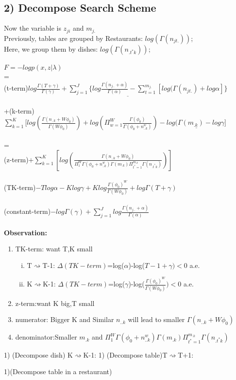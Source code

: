 \documentclass{article}
\begin{document}
\begin{spacing}{1.1}
\section{2) Decompose Search Scheme}
Now the variable is $z_{ji}$ and $m_{j.}$\\
Previously, tables are grouped by Restaurants: $log(\Gamma(n_{jt.}))$;\\
Here, we group them by dishes: $log(\Gamma(n_{.t^{*}k}))$;\\ \\
$F=-log p(x,z|\lambda)$\\ =\\
(t-term)$ \underline{log \frac{\Gamma(T+\gamma)}{\Gamma(\gamma)}+\sum_{j=1}^{J} \{log \frac{\Gamma(n_{j..}+\alpha)}{\Gamma(\alpha)}-\sum_{t=1}^{m_{j.}}[log(\Gamma(n_{jt.})+log \alpha
]\}}$\\ \\
+(k-term)$ \sum_{k=1}^{K} [log(\frac{\Gamma(n_{..k}+W\phi_{0})}{\Gamma(W\phi_{0})})+log(\Pi_{w=1}^{W}\frac{\Gamma(\phi_{0})}{\Gamma(\phi_{0}+n_{..k}^{w})})
-\underline{log(\Gamma(m_{.k})-log \gamma]}$\\ \\ 
=\\
(z-term)$ +\sum_{k=1}^{K} [log(\frac{\Gamma(n_{..k}+W\phi_{0})}{\Pi_{1}^{W}\Gamma(\phi_{0}+n_{..k}^{w})\Gamma(m_{.k})\Pi_{t^{*}=1}^{m_{.k}}\Gamma(n_{.t^{*}k})})]$\\ \\
(TK-term)$-Tlog\alpha-Klog\gamma+Klog\frac{\Gamma(\phi_{0})^{W}}{\Gamma(W\phi_{0})}+log\Gamma(T+\gamma)$\\ \\
(constant-term)$-log\Gamma(\gamma)+\sum_{j=1}^{J} log \frac{\Gamma(n_{j..}+\alpha)}{\Gamma(\alpha)}$
\\ \\
{\bf Observation:}\\
\begin{enumerate}
 \item TK-term: want T,K small
\begin{enumerate}[(i)]
 \item T$\rightsquigarrow$T-1:  $\Delta(TK-term)$=log($\alpha$)-log($T-1+\gamma)<0$ a.e.
 \item K$\rightsquigarrow$K-1: $\Delta(TK-term)$=log($\gamma$)-log($\frac{\Gamma(\phi_{0})^{W}}{\Gamma(W\phi_{0})})<0$ a.e.
\end{enumerate}
 \item z-term:want K big,T small
 \item numerator:  Bigger K and Similar $n_{..k}$ will lead to smaller $\Gamma(n_{..k}+W\phi_{0})$
 \item denominator:Smaller $m_{.k}$ and  $\Pi_{1}^{W}\Gamma(\phi_{0}+n_{..k}^{w})\Gamma(m_{.k})\Pi_{t^{*}=1}^{m_{.k}}\Gamma(n_{.t^{*}k})$
\end{enumerate}


1) (Decompose dish) K$\rightsquigarrow$K-1:
1) (Decompose table)T$\rightsquigarrow$T+1:

1)(Decompose table in a restaurant)
\end{spacing}
\end{document}
